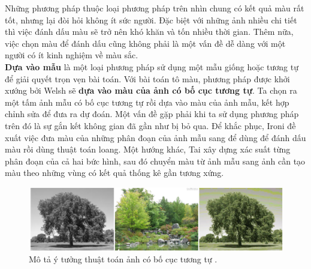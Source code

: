 \documentclass[a4paper, 12pt]{article}
\begin{document}
\noindent
Những phương pháp thuộc loại phương pháp trên nhìn chung có kết quả màu rất tốt, nhưng lại đòi hỏi không ít sức người. Đặc biệt với những ảnh nhiều chi tiết thì việc đánh dấu màu sẽ trở nên khó khăn và tốn nhiều thời gian. Thêm nữa, việc chọn màu để đánh dấu cũng không phải là một vấn đề dễ dàng với một người có ít kinh nghiệm về màu sắc.\vspace{5pt}\\
\textbf{Dựa vào mẫu} là một loại phương pháp sử dụng một mẫu giống hoặc tương tự để giải quyết trọn vẹn bài toán. Với bài toán tô màu, phương pháp được khởi xướng bởi Welsh \cite{welshcolorization} sẽ \textbf{dựa vào màu của ảnh có bố cục tương tự}. Ta chọn ra một tấm ảnh mẫu có bố cục tương tự rồi dựa vào màu của ảnh mẫu, kết hợp chỉnh sửa để đưa ra dự đoán. Một vấn đề gặp phải khi ta sử dụng phương pháp trên đó là sự gắn kết không gian đã gần như bị bỏ qua. Để khắc phục, Ironi \cite{ironicolorization} đề xuất việc đưa màu của những phân đoạn của ảnh mẫu sang để dùng để đánh dấu màu rồi dùng thuật toán loang. Một hướng khác, Tai \cite{taicolorization} xây dựng xác suất từng phân đoạn của cả hai bức hình, sau đó chuyển màu từ ảnh mẫu sang ảnh cần tạo màu theo những vùng có kết quả thống kê gần tương xứng.

\begin{figure}[!h]
\captionsetup{width=0.8\textwidth}
\centering
\includegraphics[width=15cm]{images/2_5.png}
\caption{Mô tả ý tưởng thuật toán ảnh có bố cục tương tự \cite{trungcolorization2018}.}
\label{fig:examplarmethod}
\end{figure}
\end{document}

